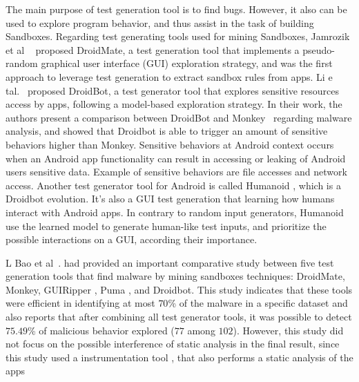 The main purpose of test generation tool is to find bugs. However, it also can be used to explore program behavior, and thus assist in the task of building Sandboxes. Regarding test generating tools used for mining Sandboxes, Jamrozik et al ~\cite{DBLP:conf/icse/JamrozikZ16} proposed DroidMate, a test generation tool that implements a pseudo-random graphical user interface (GUI) exploration strategy, and was the first approach to leverage test generation to extract sandbox rules from apps. Li e tal.~\cite{DBLP:conf/icse/LiYGC17} proposed DroidBot, a test generator tool that explores sensitive resources access by apps, following a model-based exploration strategy. In their work, the authors present a comparison between DroidBot and Monkey~\cite{Monkey} regarding malware analysis, and showed that Droidbot is able to trigger an amount of sensitive behaviors higher than Monkey. Sensitive behaviors at Android context occurs when an Android app functionality can result in accessing or leaking of Android users sensitive data. Example of sensitive behaviors are file accesses and network access. Another test generator tool for Android is called Humanoid \cite{DBLP:conf/kbse/LiY0C19}, which is a Droidbot evolution. It's also a GUI test generation that learning how humans interact with Android apps. In contrary to random input generators, Humanoid use the learned model to generate human-like test inputs, and prioritize the possible interactions on a GUI, according their importance.



L Bao et al~.\cite{DBLP:conf/wcre/BaoLL18} had provided an important comparative study between five test generation tools that find malware by mining sandboxes techniques: DroidMate, Monkey, GUIRipper \cite{DBLP:conf/kbse/AmalfitanoFTCM12}, Puma \cite{DBLP:conf/mobisys/Hao0NHG14}, and Droidbot. This study indicates that these tools were efficient in identifying at most $70$\% of the malware in a specific dataset and also reports that after combining all test generator tools, it was possible to detect $75.49$\% of malicious behavior explored ($77$ among $102$). However, this study did not focus on the possible interference of static analysis in the final result, since this study used a instrumentation tool \cite{DBLP:conf/icsm/CaiR17a}, that also performs a static analysis of the apps 




